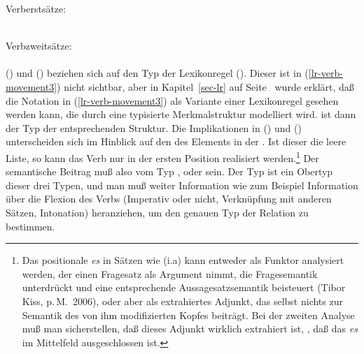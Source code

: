 \eas
Verberstsätze:\\
 \impl\\
\zs

\eas
\label{impl-v2}%
Verbzweitsätze:\\
 \impl\\
\zs
() und () beziehen sich auf den Typ der Lexikonregel ().
Dieser ist in (\ref{lr-verb-movement3}) nicht sichtbar, aber in Kapitel~\ref{sec-lr}
auf Seite~\pageref{pageref-lr-mit-dtr} wurde erklärt, daß die Notation in (\ref{lr-verb-movement3})
als Variante einer Lexikonregel gesehen werden kann, die durch eine typisierte Merkmalstruktur
modelliert wird.  ist dann der Typ der entsprechenden Struktur.
Die Implikationen in () und () unterscheiden sich im Hinblick auf den \slashw
des Elements in der \subcatl. Ist dieser die leere Liste, so kann das Verb nur in der ersten
Position realisiert werden.\footnote{
  Das positionale \emph{es} in Sätzen wie (i.a) kann entweder als Funktor analysiert werden, der einen
  Fragesatz als Argument nimmt, die Fragesemantik unterdrückt und eine entsprechende
  Aussagesatzsemantik beisteuert (Tibor Kiss, p.\,M.\ 2006), oder aber als
  extrahiertes Adjunkt, das selbst nichts zur Semantik des von ihm modifizierten Kopfes
  beiträgt. Bei der zweiten Analyse muß man sicherstellen, daß dieses Adjunkt wirklich extrahiert
  ist, \dash, daß das \emph{es} im Mittelfeld ausgeschlossen ist.
\eal
{}
\zllast
}
Der semantische Beitrag muß also vom Typ , 
oder  sein. Der Typ  ist
ein Obertyp dieser drei Typen, und man muß weiter Information wie zum Beispiel Information über
die Flexion des Verbs (Imperativ oder nicht, Verknüpfung mit anderen Sätzen, Intonation) heranziehen,
um den genauen Typ der Relation zu bestimmen.

